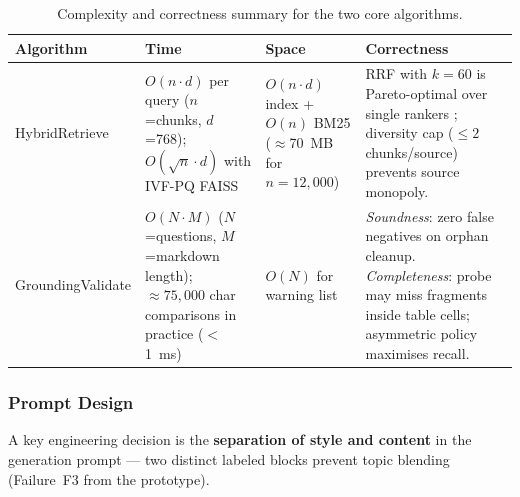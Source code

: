 \begin{table}[H]
\caption{Complexity and correctness summary for the two core algorithms.}
\label{tab:complexity}
\centering\small
\begin{tabular}{lp{3.8cm}p{2.8cm}p{5cm}}
\toprule
\textbf{Algorithm} & \textbf{Time} & \textbf{Space} & \textbf{Correctness} \\
\midrule
HybridRetrieve
  & $O(n{\cdot}d)$ per query ($n$=chunks, $d$=768); $O(\sqrt{n}{\cdot}d)$ with IVF-PQ FAISS
  & $O(n{\cdot}d)$ index + $O(n)$ BM25 ($\approx$70~MB for $n{=}12{,}000$)
  & RRF with $k{=}60$ is Pareto-optimal over single rankers \cite{cormack2009rrf};
    diversity cap (${\leq}2$ chunks/source) prevents source monopoly. \\
\addlinespace
GroundingValidate
  & $O(N{\cdot}M)$ ($N$=questions, $M$=markdown length); ${\approx}75{,}000$ char comparisons in practice ($<$1~ms)
  & $O(N)$ for warning list
  & \textit{Soundness}: zero false negatives on orphan cleanup.
    \textit{Completeness}: probe may miss fragments inside table cells;
    asymmetric policy maximises recall. \\
\bottomrule
\end{tabular}
\end{table}

\subsubsection{Prompt Design}

A key engineering decision is the \textbf{separation of style and content} in the
generation prompt --- two distinct labeled blocks prevent topic blending
(Failure~F3 from the prototype).

